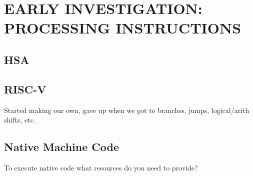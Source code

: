 \chapter{EARLY INVESTIGATION: PROCESSING INSTRUCTIONS}
\label{insn}

\section{HSA}
\label{insn:hsa}

\section{RISC-V}
\label{insn:riscv}
Started making our own, gave up when we got to branches, jumps,
logical/arith shifts, etc.

\section{Native Machine Code}
\label{insn:native}
To execute native code what resources do you need to provide?
